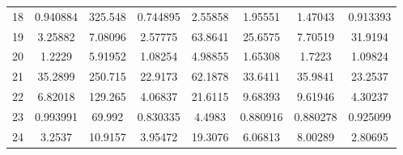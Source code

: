 \begin{center}
\begin{longtable}{cccccccc}
18 & 0.940884 & 325.548 & 0.744895 & 2.55858 & 1.95551 & 1.47043 & 0.913393\\
19 & 3.25882 & 7.08096 & 2.57775 & 63.8641 & 25.6575 & 7.70519 & 31.9194\\
20 & 1.2229 & 5.91952 & 1.08254 & 4.98855 & 1.65308 & 1.7223 & 1.09824\\
21 & 35.2899 & 250.715 & 22.9173 & 62.1878 & 33.6411 & 35.9841 & 23.2537\\
22 & 6.82018 & 129.265 & 4.06837 & 21.6115 & 9.68393 & 9.61946 & 4.30237\\
23 & 0.993991 & 69.992 & 0.830335 & 4.4983 & 0.880916 & 0.880278 & 0.925099\\
24 & 3.2537 & 10.9157 & 3.95472 & 19.3076 & 6.06813 & 8.00289 & 2.80695\\
\end{longtable}
\end{center}



